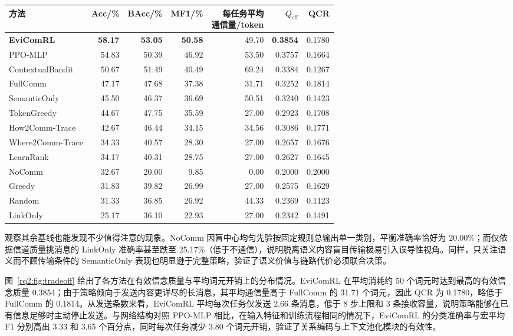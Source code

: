 \begin{table}[htbp]
\centering\small
{}
\label{rq2:tab:main}
\setlength{\tabcolsep}{3.2pt}
\begin{tabular}{lrrrrrr}
\toprule
方法 & Acc/\% & BAcc/\% & MF1/\% & \shortstack{每任务平均\\通信量/token} & $Q_{\mathrm{eff}}$ & QCR\\
\midrule
\textbf{EviComRL} & \textbf{58.17} & \textbf{53.05} & \textbf{50.58} & 49.70 & \textbf{0.3854} & 0.1780\\
PPO-MLP & 54.83 & 50.39 & 46.92 & 53.50 & 0.3757 & 0.1664\\
ContextualBandit & 50.67 & 51.49 & 40.49 & 69.24 & 0.3384 & 0.1267\\
FullComm & 47.17 & 47.68 & 37.38 & 31.71 & 0.3252 & 0.1814\\
SemanticOnly & 45.50 & 46.37 & 36.69 & 50.51 & 0.3240 & 0.1423\\
TokenGreedy & 44.67 & 47.75 & 35.59 & 27.00 & 0.2923 & 0.1708\\
How2Comm-Trace & 42.67 & 46.44 & 34.15 & 34.56 & 0.3086 & 0.1771\\
Where2Comm-Trace & 34.33 & 40.57 & 28.30 & 27.00 & 0.2657 & 0.1676\\
LearnRank & 34.17 & 40.31 & 28.75 & 27.00 & 0.2627 & 0.1645\\
NoComm & 32.67 & 20.00 & 9.85 & 0.00 & 0.2000 & 0.2000\\
Greedy & 31.83 & 39.82 & 26.99 & 27.00 & 0.2575 & 0.1629\\
Random & 31.33 & 36.85 & 26.92 & 44.33 & 0.2369 & 0.1123\\
LinkOnly & 25.17 & 36.10 & 22.93 & 27.00 & 0.2342 & 0.1491\\
\bottomrule
\end{tabular}
\end{table}

观察其余基线也能发现不少值得注意的现象。NoComm 因盲中心均匀先验按固定规则总输出单一类别，平衡准确率恰好为 20.00\%；而仅依据信道质量挑消息的 LinkOnly 准确率甚至跌至 25.17\%（低于不通信），说明脱离语义内容盲目传输极易引入误导性视角。同样，只关注语义而不顾传输条件的 SemanticOnly 表现也明显逊于完整策略，验证了语义价值与链路代价必须联合决策。


图~\ref{rq2:fig:tradeoff} 给出了各方法在有效信念质量与平均词元开销上的分布情况。EviComRL 在平均消耗约 50 个词元时达到最高的有效信念质量 0.3854；由于策略倾向于发送内容更详尽的长消息，其平均通信量高于 FullComm 的 31.71 个词元，因此 QCR 为 0.1780，略低于 FullComm 的 0.1814。从发送条数来看，EviComRL 平均每次任务仅发送 2.66 条消息，低于 8 步上限和 3 条接收容量，说明策略能够在已有信息足够时主动停止发送。与网络结构对照 PPO-MLP 相比，在输入特征和训练流程相同的情况下，EviComRL 的分类准确率与宏平均 F1 分别高出 3.33 和 3.65 个百分点，同时每次任务减少 3.80 个词元开销，验证了关系编码与上下文池化模块的有效性。

